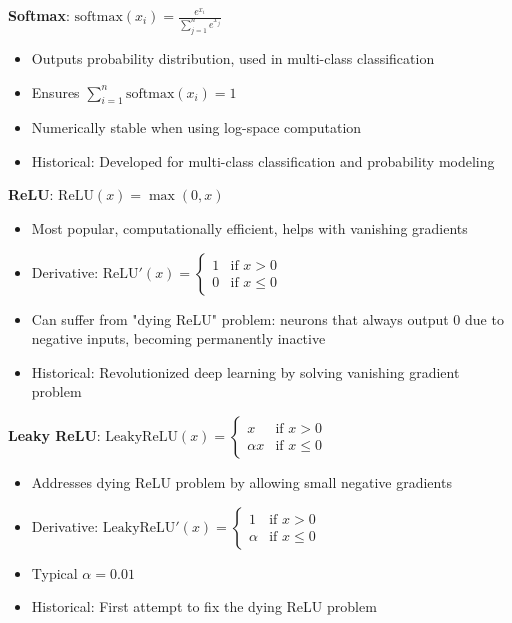 \textbf{Softmax}: $\text{softmax}(x_i) = \frac{e^{x_i}}{\sum_{j=1}^{n} e^{x_j}}$
\begin{itemize}
	\item Outputs probability distribution, used in multi-class classification
	\item Ensures $\sum_{i=1}^{n} \text{softmax}(x_i) = 1$
	\item Numerically stable when using log-space computation
	\item Historical: Developed for multi-class classification and probability modeling
\end{itemize}

\textbf{ReLU}: $\text{ReLU}(x) = \max(0, x)$
\begin{itemize}
	\item Most popular, computationally efficient, helps with vanishing gradients
	\item Derivative: $\text{ReLU}'(x) = \begin{cases} 1 & \text{if } x > 0 \\ 0 & \text{if } x \leq 0 \end{cases}$
	\item Can suffer from "dying ReLU" problem: neurons that always output 0 due to negative inputs, becoming permanently inactive
	\item Historical: Revolutionized deep learning by solving vanishing gradient problem
\end{itemize}

\textbf{Leaky ReLU}: $\text{LeakyReLU}(x) = \begin{cases} x & \text{if } x > 0 \\ \alpha x & \text{if } x \leq 0 \end{cases}$
\begin{itemize}
	\item Addresses dying ReLU problem by allowing small negative gradients
	\item Derivative: $\text{LeakyReLU}'(x) = \begin{cases} 1 & \text{if } x > 0 \\ \alpha & \text{if } x \leq 0 \end{cases}$
	\item Typical $\alpha = 0.01$
	\item Historical: First attempt to fix the dying ReLU problem
\end{itemize}


